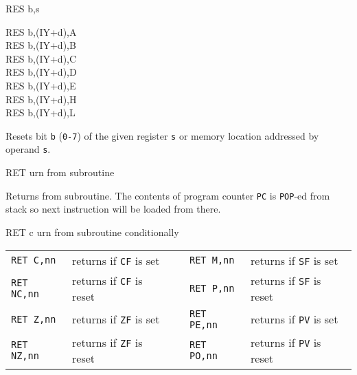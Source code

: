 \begin{basedescript}{
	\desclabelstyle{\multilinelabel}
	\desclabelwidth{3cm}}
\begin{DetailItem}{RES b,s}
\begin{DetailVariants}
			\columnbreak
			RES b,(IY+d),A\UNDOC\\
			RES b,(IY+d),B\UNDOC\\
			RES b,(IY+d),C\UNDOC\\
			RES b,(IY+d),D\UNDOC\\
			RES b,(IY+d),E\UNDOC\\
			RES b,(IY+d),H\UNDOC\\
			RES b,(IY+d),L\UNDOC
		\end{DetailVariants}

		Resets bit {\tt b} ({\tt 0-7}) of the given register {\tt s} or memory location addressed by operand {\tt s}.

		\begin{DetailEffects}
			\FlagsRESr
		\end{DetailEffects}
						
		\begin{DetailTiming}
			\DetailTime[r]{2}{8}
			\DetailTime[(HL)]{4}{15}
			\DetailTime[(IX+d)]{6}{23}
			\DetailTime[(IY+d)]{6}{23}
		\end{DetailTiming}

	\end{DetailItem}

	\pagebreak
	\begin{DetailItem}{RET}
		{urn from subroutine}
		{\SymRET}

		Returns from subroutine. The contents of program counter {\tt PC} is {\tt POP}-ed from stack so next instruction will be loaded from there.

		\begin{DetailEffects}
			\FlagsRET
		\end{DetailEffects}
				
		\begin{DetailTiming}
			\DetailTime{3}{10}
		\end{DetailTiming}

	\end{DetailItem}

	\begin{DetailItem}{RET c}
		{urn from subroutine conditionally}
		{\SymRETc{c}}

		\vspace{1ex} %
		\begin{tabular}{@{}llcll}
			{\tt RET C,nn} & returns if {\tt CF} is set & & 
				{\tt RET M,nn} & returns if {\tt SF} is set\\
			{\tt RET NC,nn} & returns if {\tt CF} is reset & & 
				{\tt RET P,nn} & returns if {\tt SF} is reset\\
			{\tt RET Z,nn} & returns if {\tt ZF} is set & & 
				{\tt RET PE,nn} & returns if {\tt PV} is set\\
			{\tt RET NZ,nn} & returns if {\tt ZF} is reset & & 
				{\tt RET PO,nn} & returns if {\tt PV} is reset\\
		\end{tabular}


\end{DetailItem}
\end{basedescript}
